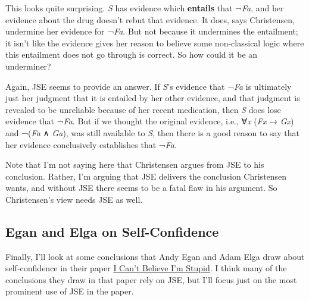 \documentclass[
  11pt,
  letterpaper,
  DIV=11,
  numbers=noendperiod,
  twoside]{scrartcl}
\begin{document}
This looks quite surprising. \emph{S} has evidence which
\textbf{entails} that ¬\emph{Fa}, and her evidence about the drug
doesn't rebut that evidence. It does, says Christensen, undermine her
evidence for ¬\emph{Fa}. But not because it undermines the entailment;
it isn't like the evidence gives her reason to believe some
non-classical logic where this entailment does not go through is
correct. So how could it be an underminer?

Again, JSE seems to provide an answer. If \emph{S}'s evidence that
¬\emph{Fa} is ultimately just her judgment that it is entailed by her
other evidence, and that judgment is revealed to be unreliable because
of her recent medication, then \emph{S} does lose evidence that
¬\emph{Fa}. But if we thought the original evidence, i.e., ∀\emph{x}
(\emph{Fx} → \emph{Gx}) and ¬(\emph{Fa} ∧ \emph{Ga}), was still
available to \emph{S}, then there is a good reason to say that her
evidence conclusively establishes that ¬\emph{Fa}.

Note that I'm not saying here that Christensen argues from JSE to his
conclusion. Rather, I'm arguing that JSE delivers the conclusion
Christensen wants, and without JSE there seems to be a fatal flaw in his
argument. So Christensen's view needs JSE as well.

\subsection{Egan and Elga on
Self-Confidence}\label{egan-and-elga-on-self-confidence}

Finally, I'll look at some conclusions that Andy Egan and Adam Elga draw
about self-confidence in their paper
\href{http://philsci-archive.pitt.edu/archive/00002432/}{I Can't Believe
I'm Stupid}. I think many of the conclusions they draw in that paper
rely on JSE, but I'll focus just on the most prominent use of JSE in the
paper.
\end{document}
